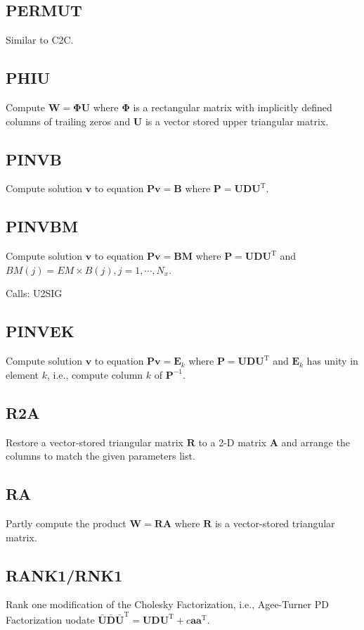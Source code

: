 \documentclass[./doc.tex]{subfiles}
\begin{document}
\subsection{PERMUT}
Similar to C2C.

\subsection{PHIU}
Compute \(\bm{W}=\bm{\Phi}\bm{U}\) where \(\bm{\Phi}\) is a rectangular matrix with implicitly
defined columns of trailing zeros and \(\bm{U}\) is a vector stored upper triangular matrix.

\subsection{PINVB}
Compute solution \(\bm{v}\) to equation \(\bm{P}\bm{v}=\bm{B}\) where \(\bm{P}=\bm{U}\bm{D}\bm{U}^{\textrm{T}}\).

\subsection{PINVBM}
Compute solution \(\bm{v}\) to equation \(\bm{P}\bm{v}=\bm{BM}\) where
\(\bm{P}=\bm{U}\bm{D}\bm{U}^{\textrm{T}}\) and \(BM(j)=EM\times B(j), j=1,\cdots, N_x\).

Calls: U2SIG

\subsection{PINVEK}
Compute solution \(\bm{v}\) to equation \(\bm{P}\bm{v}=\bm{E}_k\) where
\(\bm{P}=\bm{U}\bm{D}\bm{U}^{\textrm{T}}\) and \(\bm{E}_k\) has unity in element \(k\), i.e.,
compute column \(k\) of \(\bm{P}^{-1}\).

\subsection{R2A}
Restore a vector-stored triangular matrix \(\bm{R}\) to a 2-D matrix \(\bm{A}\) and
arrange the columns to match the given parameters list.

\subsection{RA}
Partly compute the product \(\bm{W}=\bm{R}\bm{A}\) where \(\bm{R}\) is a vector-stored triangular
matrix.

\subsection{RANK1/RNK1}
Rank one modification of the Cholesky Factorization, i.e., Agee-Turner PD Factorization uodate
\(\bm{\bar{U}} \bm{\bar{D}} \bm{\bar{U}}^{\textrm{T}}=\bm{U} \bm{D} \bm{U}^{\textrm{T}} + c \bm{a} \bm{a}^{\textrm{T}}\).
\end{document}
